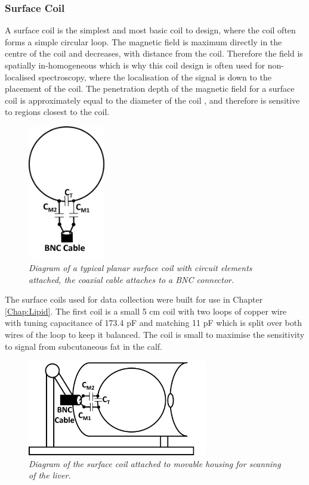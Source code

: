 \subsubsection{Surface Coil}
\label{Chap:Theory:Coils}

A surface coil is the simplest and most basic coil to design, where the coil often forms a simple circular loop. The magnetic field is maximum directly in the centre of the coil and decreases, with distance from the coil. Therefore the field is spatially in-homogeneous which is why this coil design is often used for non-localised spectroscopy, where the localisation of the signal is down to the placement of the coil. The penetration depth of the magnetic field for a surface coil is approximately equal to the diameter of the coil \cite{Gruber2018RFNonphysicists}, and therefore is sensitive to regions closest to the coil. 

\begin{figure}
    \centering
    \includegraphics[width=0.3\textwidth]{Figures/Theory/Surface_Coil.png}
    \caption{\textit{Diagram of a typical planar surface coil with circuit elements attached, the coaxial cable attaches to a BNC connector.}}
    \label{fig:theory:Surface}
\end{figure}

The surface coils used for data collection were built for use in Chapter \ref{Chap:Lipid}. The first coil is a small 5 cm coil with two loops of copper wire with tuning capacitance of 173.4 pF and matching 11 pF which is split over both wires of the loop to keep it balanced. The coil is small to maximise the sensitivity to signal from subcutaneous fat in the calf.

\begin{figure}
    \centering
    \includegraphics[width=0.7\textwidth]{Figures/Theory/Liver_Coil.png}
    \caption{\textit{Diagram of the surface coil attached to movable housing for scanning of the liver.}}
    \label{fig:theory:Liver}
\end{figure}


